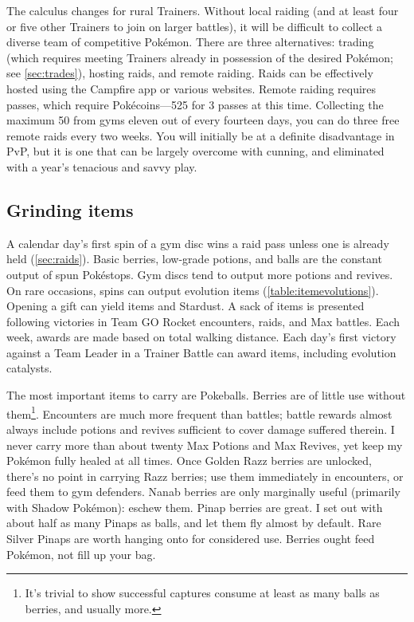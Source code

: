 The calculus changes for rural Trainers.
Without local raiding (and at least four or five other Trainers to join on larger battles),
  it will be difficult to collect a diverse team of competitive Pokémon.
There are three alternatives: trading (which requires meeting Trainers already in possession of the desired Pokémon;
  see \autoref{sec:trades}), hosting raids, and remote raiding.
Raids can be effectively hosted using the Campfire app or various websites.
Remote raiding requires passes, which require Pokécoins---525 for 3 passes at this time.
Collecting the maximum 50 from gyms eleven out of every fourteen days, you can do
  three free remote raids every two weeks.
You will initially be at a definite disadvantage in PvP, but it is one that can
  be largely overcome with cunning, and eliminated with a year's tenacious
  and savvy play.

\subsection{Grinding items\label{subsec:grinditems}}
A calendar day's first spin of a gym disc wins a raid pass unless one is already held (\autoref{sec:raids}).
Basic berries, low-grade potions, and balls are the constant output of spun Pokéstops.
Gym discs tend to output more potions and revives.
On rare occasions, spins can output evolution items (\autoref{table:itemevolutions}).
Opening a gift can yield items and Stardust.
A sack of items is presented following victories in Team GO Rocket encounters, raids, and Max battles.
Each week, awards are made based on total walking distance.
Each day's first victory against a Team Leader in a Trainer Battle can award items,
  including evolution catalysts.

The most important items to carry are Pokeballs.
Berries are of little use without them\footnote{It's trivial to show successful
 captures consume at least as many balls as berries, and usually more.}.
Encounters are much more frequent than battles; battle rewards almost always
 include potions and revives sufficient to cover damage suffered therein.
I never carry more than about twenty Max Potions and Max Revives, yet keep my Pokémon fully healed at all times.
Once Golden Razz berries are unlocked, there's no point in carrying Razz berries;
  use them immediately in encounters, or feed them to gym defenders.
Nanab berries are only marginally useful (primarily with Shadow Pokémon): eschew them.
Pinap berries are great.
I set out with about half as many Pinaps as balls, and let them fly almost by default.
Rare Silver Pinaps are worth hanging onto for considered use.
Berries ought feed Pokémon, not fill up your bag.

